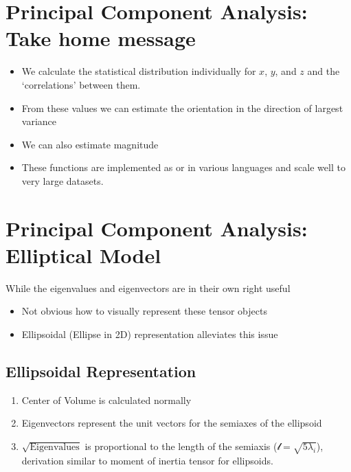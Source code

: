 \documentclass[letterpaper,10pt,english]{sphinxmanual}
\begin{document}
\section{Principal Component Analysis: Take home message}
\label{\detokenize{06-ShapeAnalysis:principal-component-analysis-take-home-message}}\begin{itemize}
\item {} 
\sphinxAtStartPar
We calculate the statistical distribution individually for \(x\), \(y\), and \(z\) and the ‘correlations’ between them.

\item {} 
\sphinxAtStartPar
From these values we can estimate the orientation in the direction of largest variance

\item {} 
\sphinxAtStartPar
We can also estimate magnitude

\item {} 
\sphinxAtStartPar
These functions are implemented as  or  in various languages and scale well to very large datasets.

\end{itemize}


\section{Principal Component Analysis: Elliptical Model}
\label{\detokenize{06-ShapeAnalysis:principal-component-analysis-elliptical-model}}
\sphinxAtStartPar
While the eigenvalues and eigenvectors are in their own right useful
\begin{itemize}
\item {} 
\sphinxAtStartPar
Not obvious how to visually represent these tensor objects

\item {} 
\sphinxAtStartPar
Ellipsoidal (Ellipse in 2D) representation alleviates this issue

\end{itemize}


\subsection{Ellipsoidal Representation}
\label{\detokenize{06-ShapeAnalysis:ellipsoidal-representation}}\begin{enumerate}
%
\item {} 
\sphinxAtStartPar
Center of Volume is calculated normally

\item {} 
\sphinxAtStartPar
Eigenvectors represent the unit vectors for the semiaxes of the ellipsoid

\item {} 
\sphinxAtStartPar
\(\sqrt{\text{Eigenvalues}}\) is proportional to the length of the semiaxis (\(\mathcal{l}=\sqrt{5\lambda_i}\)), derivation similar to moment of inertia tensor for ellipsoids.

\end{enumerate}
\end{document}
